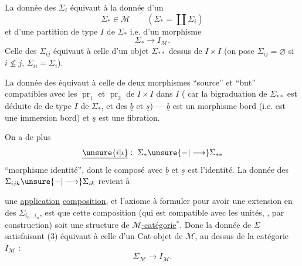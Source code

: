 

La donnée des \(\Sigma_i\) équivaut à la donnée d'un
\[
 \Sigma_*\in\mathcal M\qquad
 \left(\Sigma_*=\coprod\Sigma_i\right)
\]
et d'une partition de type \(I\) de \(\Sigma_*\) i.e. d'un morphisme
\[
 \Sigma_*\longrightarrow I_{\mathcal M}.
\]
Celle des \(\Sigma_{ij}\) équivaut à celle
d'un objet \(\Sigma_{**}\)   dessus de \(I\times I\)
(on pose \(\Sigma_{ij}=\varnothing\) si \(i\not\le j\),
\(\Sigma_{ii}=\Sigma_i\)).

La donnée des
équivaut à celle de deux morphismes ``source'' et ``but''
\diagram{\begin{tikzcd}
 \Sigma_{**}\arrow[r,"\underline b"]\arrow[d,"\underline s"']&\Sigma_*\\
 \Sigma_*&
\end{tikzcd}}
compatibles avec les \(\operatorname{pr}_1\) et \(\operatorname{pr}_2\)
de \(I\times I\) dans \(I\)
(
car la bigraduation 
de \(\Sigma_{**}\) est déduite de 
 de type \(I\) de \(\Sigma_*\), et des
\(\underline b\) et \(\underline s\)) ---
 \(\underline b\) est 
un morphisme bord (i.e. est une
immersion bord) et \(\underline s\) est une fibration.

On a de plus 
\[
 \underline{\unsure{i|\iota}}:\ \Sigma_*\unsure{-|\longrightarrow}\Sigma_{**}
\]
``morphisme identité'', dont le composé avec \(\underline b\) et
\(\underline s\) est l'identité. La donnée des
\(\Sigma_{ijk}\unsure{-|\longrightarrow}\Sigma_{ik}\) revient à


une \uline{application} \uline{composition}, et l'axiome à
formuler pour avoir une extension 
en des \(\Sigma_{i_0\ldots i_n}\), est que cette composition
(qui est compatible avec les unités, ,
par construction) soit une structure de
\uline{\(\mathcal M\)-catégorie}\(^*\). 
Donc la donnée de \(\Sigma\) satisfaisant (3)
équivaut à celle d'un Cat-objet de \(\mathcal M\),
au dessus de la catégorie  \(I_{\mathcal M}\) :
\[
 \Sigma_{\mathcal M}\longrightarrow I_{\mathcal M}.
\]

